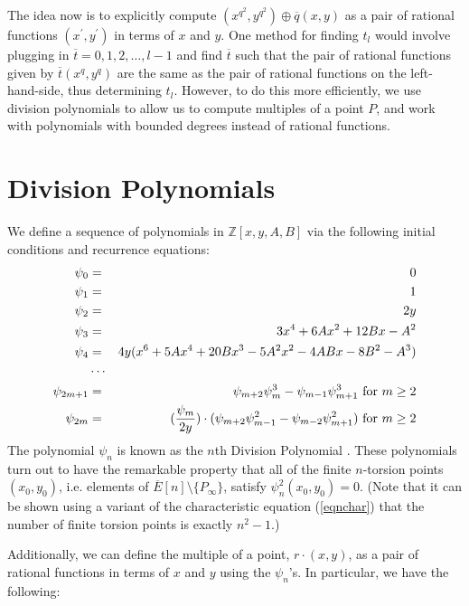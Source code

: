 \documentclass{article}
\newcommand{\z}{\mathbb{Z}}
\begin{document}
The idea now is to explicitly compute $(x^{q^2},y^{q^2}) \oplus \overline{q}(x,y)$ as a pair of
rational functions $(x^\prime,y^\prime)$ in terms of $x$ and $y$.  One method for finding $t_l$
would involve plugging in $\overline{t} = 0, 1, 2, \dots, l-1$ and find $\overline{t}$ such that
the pair of rational functions given by $\overline{t}(x^q,y^q)$ are the same as the pair of
rational functions on the left-hand-side, thus determining $t_l$.  However, to do this more
efficiently, we use division polynomials to allow us to compute multiples of a point $P$, and work
with polynomials with bounded degrees instead of rational functions.

\section{Division Polynomials} \label{DivPol}

We define a sequence of polynomials in $\z[x,y,A,B]$ via the following initial conditions and recurrence equations:
\begin{eqnarray*}
\psi_0 &=& 0 \\
\psi_1 &=& 1 \\
\psi_2 &=& 2y \\
\psi_3 &=& 3x^4 + 6Ax^2 + 12Bx-A^2 \\
\psi_4 &=& 4y(x^6 + 5Ax^4 + 20Bx^3 - 5A^2x^2 - 4ABx - 8B^2 - A^3) \\
&\cdots& \\
\psi_{2m+1} &=& \psi_{m+2}\psi_m^3 - \psi_{m-1}\psi_{m+1}^3 \mathrm{~for~ }m \geq 2 \\
\psi_{2m} &=& ({\psi_m \over 2y})\cdot (\psi_{m+2}\psi_{m-1}^2 - \psi_{m-2}\psi_{m+1}^2)  \mathrm{~for~ }m \geq 2
\end{eqnarray*}
The polynomial $\psi_n$ is known as the $n$th Division Polynomial \cite{Lang,Wash}.  These
polynomials turn out to have the remarkable property that all of the finite $n$-torsion points
$(x_0,y_0)$, i.e. elements of $\overline{E}[n] \setminus \{P_\infty\}$, satisfy $\psi_n^2(x_0,y_0)
= 0$.  (Note that it can be shown using a variant of the characteristic equation (\ref{eqnchar}) that the number of finite torsion 
points is exactly $n^2-1$.)

Additionally, we can define the multiple of a point, $r\cdot(x,y)$, as a pair of rational functions
in terms of $x$ and $y$ using the $\psi_n$'s. In particular, we have the following:
\end{document}
